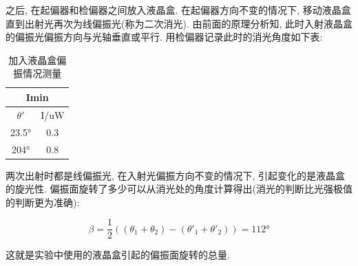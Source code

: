 \documentclass[12pt,a4paper]{article}
\newcommand{\be}[1]{
    \begin{equation}
        #1
    \end{equation}
}
\begin{document}
之后, 在起偏器和检偏器之间放入液晶盒. 在起偏器方向不变的情况下, 移动液晶盒直到出射光再次为线偏振光(称为二次消光). 由前面的原理分析知, 此时入射液晶盒的偏振光偏振方向与光轴垂直或平行. 
用检偏器记录此时的消光角度如下表: 
\begin{table}[H]
    \centering
    \begin{tabular}{|cc|}
    \hline
    \multicolumn{2}{|c|}{Imin}         \\ \hline
    \multicolumn{1}{|c|}{$\theta '$}  & I/uW \\ \hline
    \multicolumn{1}{|c|}{23.5°}   & 0.3 \\ \hline
    \multicolumn{1}{|c|}{204°} & 0.8 \\ \hline
    \end{tabular}
    \caption{加入液晶盒偏振情况测量}
    \end{table}

两次出射时都是线偏振光, 在入射光偏振方向不变的情况下, 引起变化的是液晶盒的旋光性. 偏振面旋转了多少可以从消光处的角度计算得出(消光的判断比光强极值的判断更为准确): 
\be{\beta=\frac{1}{2}((\theta_1 +\theta_2)-(\theta'_1+\theta'_2))=112°}
这就是实验中使用的液晶盒引起的偏振面旋转的总量. 
\end{document}
